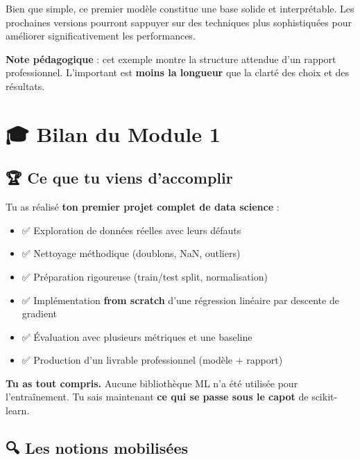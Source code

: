 \documentclass[
  french,
  11pt,
  a4paper,
]{scrbook}
\newenvironment{Shaded}{}{}
\newcommand{\NormalTok}[1]{\textcolor[rgb]{0.14,0.16,0.18}{#1}}
\providecommand{\tightlist}{%
  \setlength{\itemsep}{0pt}\setlength{\parskip}{0pt}}
\begin{document}
\begin{tcolorbox}
\begin{Shaded}
\begin{Highlighting}[]
\NormalTok{Bien que simple, ce premier modèle constitue une base solide et }
\NormalTok{interprétable. Les prochaines versions pourront s\textquotesingle{}appuyer sur }
\NormalTok{des techniques plus sophistiquées pour améliorer significativement }
\NormalTok{les performances.}
\end{Highlighting}
\end{Shaded}

\textbf{Note pédagogique} : cet exemple montre la structure attendue
d'un rapport professionnel. L'important est \textbf{moins la longueur}
que la clarté des choix et des résultats.

\end{tcolorbox}

\chapter{🎓 Bilan du Module 1}\label{bilan-du-module-1}

\section{🏆 Ce que tu viens
d'accomplir}\label{ce-que-tu-viens-daccomplir-1}

Tu as réalisé \textbf{ton premier projet complet de data science} :

\begin{itemize}
\tightlist
\item
  ✅ Exploration de données réelles avec leurs défauts
\item
  ✅ Nettoyage méthodique (doublons, NaN, outliers)
\item
  ✅ Préparation rigoureuse (train/test split, normalisation)
\item
  ✅ Implémentation \textbf{from scratch} d'une régression linéaire par
  descente de gradient
\item
  ✅ Évaluation avec plusieurs métriques et une baseline
\item
  ✅ Production d'un livrable professionnel (modèle + rapport)
\end{itemize}

\textbf{Tu as tout compris.} Aucune bibliothèque ML n'a été utilisée
pour l'entraînement. Tu sais maintenant \textbf{ce qui se passe sous le
capot} de scikit-learn.

\section{🔍 Les notions mobilisées}\label{les-notions-mobilisuxe9es}
\end{document}
